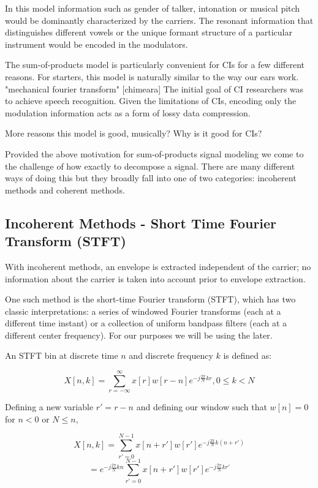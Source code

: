 \documentclass [11pt, proquest] {uwthesis}[2015/03/03]
\begin{document}
In this model information such as gender of talker, intonation or musical pitch would be dominantly characterized by the carriers.  The resonant information that distinguishes different vowels or the unique formant structure of a particular instrument would be encoded in the modulators.

The sum-of-products model is particularly convenient for CIs for a few different reasons. For starters, this model is naturally similar to the way our ears work. "mechanical fourier transform" [chimeara] The initial goal of CI researchers was to achieve speech recognition.  Given the limitations of CIs, encoding only the modulation information acts as a form of lossy data compression.

More reasons this model is good, musically?
Why is it good for CIs?

Provided the above motivation for sum-of-products signal modeling we come to the challenge of how exactly to decompose a signal.  There are many different ways of doing this but they broadly fall into one of two categories: incoherent methods and coherent methods.

\subsection{Incoherent Methods - Short Time Fourier Transform (STFT)}

With incoherent methods, an envelope is extracted independent of the carrier; no information about the carrier is taken into account prior to envelope extraction.

One such method is the short-time Fourier transform (STFT), which has two classic interpretations: a series of windowed Fourier transforms (each at a different time instant) or a collection of uniform bandpass filters (each at a different center frequency).  For our purposes we will be using the later.

An STFT bin at discrete time $n$ and discrete frequency $k$ is defined as:

$$X[n,k] = \sum\limits_{r=-\infty}^{\infty} x[r] w[r - n] e^{-j\frac{2\pi}{N}kr}, 0 \leq k < N$$

Defining a new variable $r' = r - n$ and defining our window such that  $w[n] = 0$ for $n < 0$ or $N \leq n$,

$$X[n,k] = \sum\limits_{r'=0}^{N-1} x[n + r'] w[r'] e^{-j\frac{2\pi}{N}k(n + r')}$$
$$= e^{-j\frac{2\pi}{N}kn} \sum\limits_{r'=0}^{N-1} x[n + r'] w[r'] e^{-j\frac{2\pi}{N}kr'}$$
\end{document}
